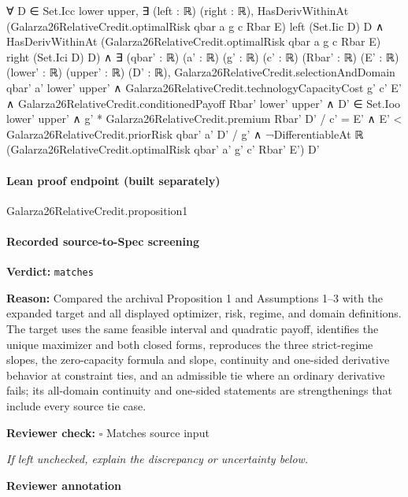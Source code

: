 \documentclass[10pt]{article}
\newcommand{\reviewerbox}{%
  \par\noindent\fbox{\parbox{0.96\linewidth}{\rule{0pt}{0.38in}}}\par
}
\newcommand{\reviewmatch}[1]{%
  \par\noindent\textbf{Reviewer check:} $\square$\; #1\par
  \noindent\emph{If left unchecked, explain the discrepancy or uncertainty below.}\par
}
\begin{document}
\begin{ReviewVerbatim}
                        ∀ D ∈ Set.Icc lower upper,
                          ∃ (left : ℝ) (right : ℝ),
                            HasDerivWithinAt (Galarza26RelativeCredit.optimalRisk qbar a g c Rbar E) left (Set.Iic D)
                                D ∧
                              HasDerivWithinAt (Galarza26RelativeCredit.optimalRisk qbar a g c Rbar E) right (Set.Ici D)
                                D) ∧
  ∃ (qbar' : ℝ) (a' : ℝ) (g' : ℝ) (c' : ℝ) (Rbar' : ℝ) (E' : ℝ) (lower' : ℝ) (upper' : ℝ) (D' : ℝ),
    Galarza26RelativeCredit.selectionAndDomain qbar' a' lower' upper' ∧
      Galarza26RelativeCredit.technologyCapacityCost g' c' E' ∧
        Galarza26RelativeCredit.conditionedPayoff Rbar' lower' upper' ∧
          D' ∈ Set.Ioo lower' upper' ∧
            g' * Galarza26RelativeCredit.premium Rbar' D' / c' = E' ∧
              E' < Galarza26RelativeCredit.priorRisk qbar' a' D' / g' ∧
                ¬DifferentiableAt ℝ (Galarza26RelativeCredit.optimalRisk qbar' a' g' c' Rbar' E') D'
\end{ReviewVerbatim}

\paragraph{Lean proof endpoint (built separately)}\begin{ReviewVerbatim}
Galarza26RelativeCredit.proposition1
\end{ReviewVerbatim}

\paragraph{Recorded source-to-Spec screening}
\textbf{Verdict:} \texttt{matches}
\\
{\raggedright
\textbf{Reason:} Compared the archival Proposition 1 and Assumptions 1–3 with the expanded target and all displayed optimizer, risk, regime, and domain definitions.\allowbreak{} The target uses the same feasible interval and quadratic payoff, identifies the unique maximizer and both closed forms, reproduces the three strict-\allowbreak{}regime slopes, the zero-\allowbreak{}capacity formula and slope, continuity and one-\allowbreak{}sided derivative behavior at constraint ties, and an admissible tie where an ordinary derivative fails;\allowbreak{} its all-\allowbreak{}domain continuity and one-\allowbreak{}sided statements are strengthenings that include every source tie case.\allowbreak{}
\par}
\reviewmatch{Matches source input}
\noindent\textbf{Reviewer annotation}\par
\reviewerbox
\clearpage
\hypertarget{source-claim-f0d8e27dfc3b3ee3}{}
\end{document}
